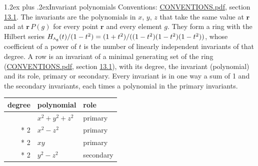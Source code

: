 \documentclass[10pt,a4paper]{article}
\makeatletter
\renewcommand\section{\@startsection{section}{1}{\z@}{-3ex plus -1ex minus -.2ex}%
  {1.2ex plus .2ex}{\normalfont\large\sffamily\bfseries\color{parttitle}}}
\numberwithin{equation}{section}
\newcommand{\irr}[1]{\text{\normalfont\scshape #1}}
\newcommand{\ptag}[1]{\mathrm{#1}}
\newcommand{\pointr}{\mathbf{r}}
\makeatother
\begin{document}
\section{Invariant polynomials}\label{s:invariant_polynomials}
Conventions: \href{../../CONVENTIONS.pdf}{CONVENTIONS.pdf}, section \href{../../CONVENTIONS.pdf\#conv.13.1}{13.1}.
The invariants are the polynomials in $x$, $y$, $z$ that take the same value at $\pointr$ and at $\pointr\,P(g)$ for every point $\pointr$ and every element $g$. They form a ring with the Hilbert series $H_{\irr{a}_{\ptag{g}}}(t)/(1-t^{2}) = (1 + t^{2})/((1-t^{2})(1-t^{2})(1-t^{2}))$, whose coefficient of a power of $t$ is the number of linearly independent invariants of that degree. \label{n:head.degree}\label{n:head.role}A row is an invariant of a minimal generating set of the ring (\href{../../CONVENTIONS.pdf}{CONVENTIONS.pdf}, section \href{../../CONVENTIONS.pdf\#conv.13.1}{13.1}), with its degree, the invariant (polynomial) and its role, primary or secondary. Every invariant is in one way a sum of 1 and the secondary invariants, each times a polynomial in the primary invariants.
{\small\begin{longtable}{@{}rll@{}}\toprule
degree & polynomial & role\\\midrule\endhead
\bottomrule\endfoot\endlastfoot
2 & $x^{2} + y^{2} + z^{2}$ & primary\\*
2 & $x^{2} - z^{2}$ & primary\\*
2 & $xy$ & primary\\*
2 & $y^{2} - z^{2}$ & secondary\\
\bottomrule\end{longtable}}
\end{document}
